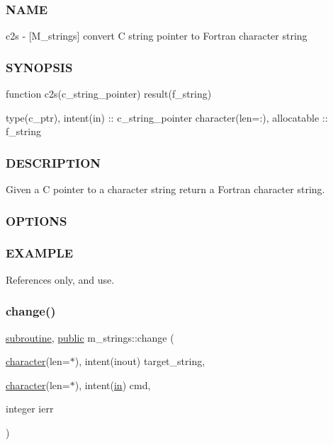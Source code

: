 \subsubsection*{N\+A\+ME}

c2s -\/ \mbox{[}M\+\_\+strings\mbox{]} convert C string pointer to Fortran character string 

\subsubsection*{S\+Y\+N\+O\+P\+S\+IS}

\begin{DoxyVerb}function c2s(c_string_pointer) result(f_string)

 type(c_ptr), intent(in)       :: c_string_pointer
 character(len=:), allocatable  :: f_string
\end{DoxyVerb}
 \subsubsection*{D\+E\+S\+C\+R\+I\+P\+T\+I\+ON}

Given a C pointer to a character string return a Fortran character string. \subsubsection*{O\+P\+T\+I\+O\+NS}

\subsubsection*{E\+X\+A\+M\+P\+LE}

References only, and use.

\mbox{\label{namespacem__strings_a1222f3b718f7637105bde330367925e1}} 
\subsubsection{\texorpdfstring{change()}{change()}}
{\footnotesize\ttfamily \hyperlink{M__stopwatch_83_8txt_acfbcff50169d691ff02d4a123ed70482}{subroutine}, \hyperlink{M__stopwatch_83_8txt_a2f74811300c361e53b430611a7d1769f}{public} m\+\_\+strings\+::change (\begin{DoxyParamCaption}\item[{\hyperlink{option__stopwatch_83_8txt_abd4b21fbbd175834027b5224bfe97e66}{character}(len=$\ast$), intent(inout)}]{target\+\_\+string,  }\item[{\hyperlink{option__stopwatch_83_8txt_abd4b21fbbd175834027b5224bfe97e66}{character}(len=$\ast$), intent(\hyperlink{M__journal_83_8txt_afce72651d1eed785a2132bee863b2f38}{in})}]{cmd,  }\item[{integer}]{ierr }\end{DoxyParamCaption})}



